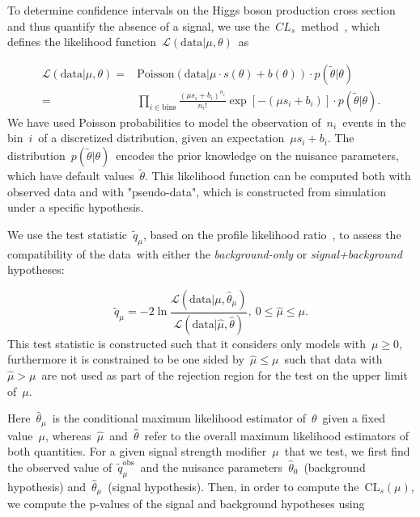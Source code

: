 To determine confidence intervals on the Higgs boson production cross section and thus quantify the absence of a signal, we use the~$CL_s$~method~\cite{Junk:1999kv,Read:2002}, which defines the likelihood function~$\mathcal{L}(\mathrm{data} | \mu, \theta)$~as

\begin{align}
\label{eq:likelihood}
\mathcal{L}(\mathrm{data} | \mu, \theta) =&  \mathrm{Poisson}(\mathrm{data} | \mu \cdot s(\theta) + b(\theta)) \cdot p(\tilde{\theta} | \theta)\\
=& \prod_{i\in \mathrm{bins}} \frac{(\mu s_i + b_i)^{n_i}}{n_i!} \exp{[-(\mu s_i + b_i)]} \cdot p(\tilde{\theta} | \theta).
\end{align}
We have used Poisson probabilities to model the observation of~$n_i$~events in the bin~$i$~of a discretized distribution, given an expectation~$\mu s_i + b_i$. The distribution~$p(\tilde{\theta} | \theta)$~encodes the prior knowledge on the nuisance parameters, which have default values~$\tilde{\theta}$. This likelihood function can be computed both with observed data and with "pseudo-data", which is constructed from simulation under a specific hypothesis.

We use the test statistic~$\tilde{q}_\mu$, based on the profile likelihood ratio~\cite{Cowan:2010js}, to assess the compatibility of the data with either the \textit{background-only} or \textit{signal+background} hypotheses:

\begin{equation}
\tilde{q}_\mu = -2 \ln{\frac{\mathcal{L}(\mathrm{data} | \mu, \hat{\theta}_\mu)}{\mathcal{L}(\mathrm{data} | \hat{\mu}, \hat{\theta})}},\ 0 \le \hat{\mu} \le \mu.
\end{equation}
This test statistic is constructed such that it considers only models with~$\mu \ge 0$, furthermore it is constrained to be one sided by~$\hat{\mu} \le \mu$~such that data with~$\hat{\mu} > \mu$~are not used as part of the rejection region for the test on the upper limit of~$\mu$.

Here~$\hat{\theta}_\mu$~is the conditional maximum likelihood estimator of~$\theta$~given a fixed value~$\mu$, whereas~$\hat{\mu}$~and~$\hat{\theta}$~refer to the overall maximum likelihood estimators of both quantities. For a given signal strength modifier~$\mu$~that we test, we first find the observed value of~$\tilde{q}_\mu^{\mathrm{obs}}$~and the nuisance parameters~$\hat{\theta}_0$~(background hypothesis) and~$\hat{\theta}_\mu$~(signal hypothesis). Then, in order to compute the~$\mathrm{CL}_s(\mu)$, we compute the p-values of the signal and background hypotheses using

